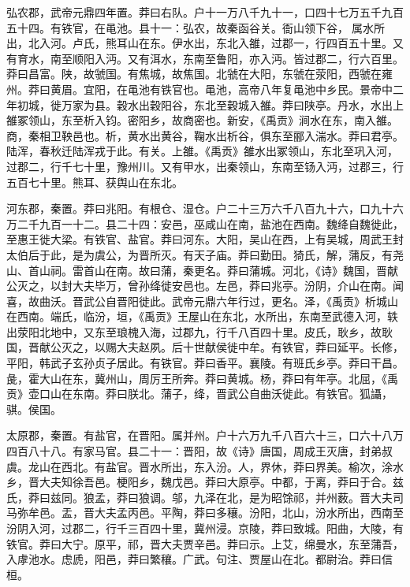 \documentclass[12pt,UTF8]{ctexbook}
\begin{document}
弘农郡，武帝元鼎四年置。莽曰右队。户十一万八千九十一，口四十七万五千九百五十四。有铁官，在黾池。县十一：弘农，故秦函谷关。衙山领下谷，属水所出，北入河。卢氏，熊耳山在东。伊水出，东北入雒，过郡一，行四百五十里。又有育水，南至顺阳入沔。又有洱水，东南至鲁阳，亦入沔。皆过郡二，行六百里。莽曰昌富。陕，故虢国。有焦城，故焦国。北虢在大阳，东虢在荥阳，西虢在雍州。莽曰黄眉。宜阳，在黾池有铁官也。黾池，高帝八年复黾池中乡民。景帝中二年初城，徙万家为县。穀水出穀阳谷，东北至穀城入雒。莽曰陕亭。丹水，水出上雒冢领山，东至析入钧。密阳乡，故商密也。新安，《禹贡》涧水在东，南入雒。商，秦相卫鞅邑也。析，黄水出黄谷，鞠水出析谷，俱东至郦入湍水。莽曰君亭。陆浑，春秋迁陆浑戎于此。有关。上雒。《禹贡》雒水出冢领山，东北至巩入河，过郡二，行千七十里，豫州川。又有甲水，出秦领山，东南至钖入沔，过郡三，行五百七十里。熊耳、获舆山在东北。



河东郡，秦置。莽曰兆阳。有根仓、湿仓。户二十三万六千八百九十六，口九十六万二千九百一十二。县二十四：安邑，巫咸山在南，盐池在西南。魏绛自魏徙此，至惠王徙大梁。有铁官、盐官。莽曰河东。大阳，吴山在西，上有吴城，周武王封太伯后于此，是为虞公，为晋所灭。有天子庙。莽曰勤田。猗氏，解，蒲反，有尧山、首山祠。雷首山在南。故曰蒲，秦更名。莽曰蒲城。河北，《诗》魏国，晋献公灭之，以封大夫毕万，曾孙绛徙安邑也。左邑，莽曰兆亭。汾阴，介山在南。闻喜，故曲沃。晋武公自晋阳徙此。武帝元鼎六年行过，更名。泽，《禹贡》析城山在西南。端氏，临汾，垣，《禹贡》王屋山在东北，水所出，东南至武德入河，轶出荥阳北地中，又东至琅槐入海，过郡九，行千八百四十里。皮氏，耿乡，故耿国，晋献公灭之，以赐大夫赵夙。后十世献侯徙中牟。有铁官，莽曰延平。长修，平阳，韩武子玄孙贞子居此。有铁官。莽曰香平。襄陵。有班氏乡亭。莽曰干昌。彘，霍大山在东，冀州山，周厉王所奔。莽曰黄城。杨，莽曰有年亭。北屈，《禹贡》壶口山在东南。莽曰朕北。蒲子，绛，晋武公自曲沃徙此。有铁官。狐讘，骐。侯国。



太原郡，秦置。有盐官，在晋阳。属并州。户十六万九千八百六十三，口六十八万四百八十八。有家马官。县二十一：晋阳，故《诗》唐国，周成王灭唐，封弟叔虞。龙山在西北。有盐官。晋水所出，东入汾。人，界休，莽曰界美。榆次，涂水乡，晋大夫知徐吾邑。梗阳乡，魏戊邑。莽曰大原亭。中都，于离，莽曰于合。兹氏，莽曰兹同。狼孟，莽曰狼调。邬，九泽在北，是为昭馀祁，并州薮。晋大夫司马弥牟邑。盂，晋大夫孟丙邑。平陶，莽曰多穰。汾阳，北山，汾水所出，西南至汾阴入河，过郡二，行千三百四十里，冀州浸。京陵，莽曰致城。阳曲，大陵，有铁官。莽曰大宁。原平，祁，晋大夫贾辛邑。莽曰示。上艾，绵曼水，东至蒲吾，入虖池水。虑虒，阳邑，莽曰繁穰。广武。句注、贾屋山在北。都尉治。莽曰信桓。
\end{document}
